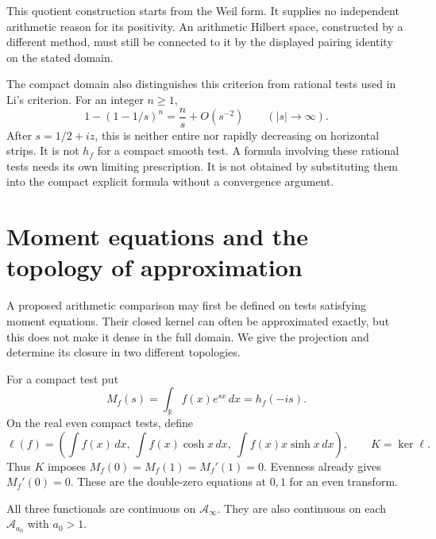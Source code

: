 This quotient construction starts from the Weil form. It supplies no
independent arithmetic reason for its positivity. An arithmetic Hilbert
space, constructed by a different method, must still be connected to it
by the displayed pairing identity on the stated domain.

The compact domain also distinguishes this criterion from rational
tests used in Li's criterion. For an integer \(n\ge1\),
\[
 1-(1-1/s)^n=\frac ns+O(s^{-2})\qquad(|s|\to\infty).
\]
After \(s=1/2+iz\), this is neither entire nor rapidly decreasing
on horizontal strips. It is not \(h_f\) for a compact smooth test.
A formula involving these rational tests needs its own limiting
prescription. It is not obtained by substituting them into the compact
explicit formula without a convergence argument.

\section{Moment equations and the topology of approximation}
\label{v4-arith:weil:moments}

A proposed arithmetic comparison may first be defined on tests satisfying
moment equations. Their closed kernel can often be approximated exactly,
but this does not make it dense in the full domain. We give the projection
and determine its closure in two different topologies.

For a compact test put
\[
 M_f(s)=\int_{\mathbb R}f(x)e^{sx}\,dx=h_f(-is).
\]
On the real even compact tests, define
\[
 \ell(f)=\left(\int f(x)\,dx,\
          \int f(x)\cosh x\,dx,\
          \int f(x)x\sinh x\,dx\right),\qquad K=\ker\ell.
\]
Thus \(K\) imposes \(M_f(0)=M_f(1)=M_f'(1)=0\).
Evenness already gives \(M_f'(0)=0\).
These are the double-zero equations at \(0,1\) for an even transform.

All three functionals are continuous on \(\mathscr A_\infty\).
They are also continuous on each \(\mathscr A_{a_0}\) with \(a_0>1\).

